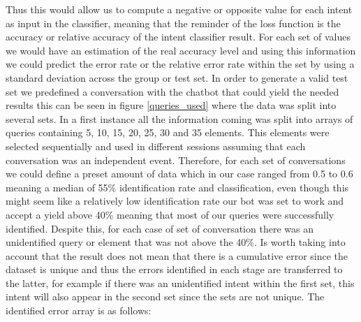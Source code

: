 Thus this would allow us to compute a negative or opposite value for each intent as input in the classifier, meaning that the reminder of the loss function is the accuracy or relative accuracy of the intent classifier result. For each set of values we would have an estimation of the real accuracy level and using this information we could predict the error rate or the relative error rate within the set by using a standard deviation across the group or test set. In order to generate a valid test set we predefined a conversation with the chatbot that could yield the needed results this can be seen in figure \ref{queries_used} where the data was split into several sets. In a first instance all the information coming was split into arrays of queries containing 5, 10, 15, 20, 25, 30 and 35 elements. This elements were selected sequentially and used in different sessions assuming that each conversation was an independent event. Therefore, for each set of conversations we could define a  preset amount of data which in our case ranged from 0.5 to 0.6 meaning a median of 55\% identification rate and classification, even though this might seem like a relatively low identification rate our bot was set to work and accept a yield above 40\% meaning that most of our queries were successfully identified. Despite this, for each case of set of conversation there was an unidentified query or element that was not above the 40\%. Is worth taking into account that the result does not mean that there is a cumulative error since the dataset is unique and thus the errors identified in each stage are transferred to the latter, for example if there was an unidentified intent within the first set, this intent will also appear in the second set since the sets are not unique. The identified error array is as follows:
\begin{table}[!h]
\caption{Error in Intent Identification per Round}
\label{tab:intent_classification_error}
\end{table}

